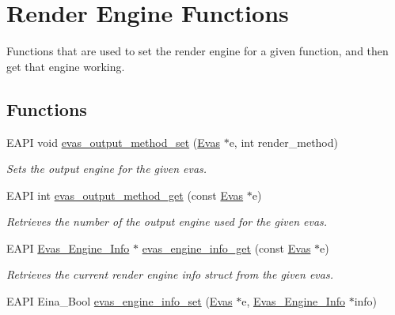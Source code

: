 \section{Render Engine Functions}
\label{group__Evas__Output__Method}


Functions that are used to set the render engine for a given function, and then get that engine working.  


\subsection*{Functions}
\begin{DoxyCompactItemize}
\item 
EAPI void \hyperlink{group__Evas__Output__Method_gab6cca6c7a5edabef057790889d560b11}{evas\_\-output\_\-method\_\-set} (\hyperlink{group__Evas__Canvas_ga5ff87cc4ce6bc43e3b640a6d37f73043}{Evas} $\ast$e, int render\_\-method)
\begin{DoxyCompactList}\small\item\em Sets the output engine for the given evas. \item\end{DoxyCompactList}\item 
EAPI int \hyperlink{group__Evas__Output__Method_gac4127a10231f1851cc3443a84fb0b059}{evas\_\-output\_\-method\_\-get} (const \hyperlink{group__Evas__Canvas_ga5ff87cc4ce6bc43e3b640a6d37f73043}{Evas} $\ast$e)
\begin{DoxyCompactList}\small\item\em Retrieves the number of the output engine used for the given evas. \item\end{DoxyCompactList}\item 
EAPI \hyperlink{struct__Evas__Engine__Info}{Evas\_\-Engine\_\-Info} $\ast$ \hyperlink{group__Evas__Output__Method_ga882d5f9411b5556719bdf28a134ee713}{evas\_\-engine\_\-info\_\-get} (const \hyperlink{group__Evas__Canvas_ga5ff87cc4ce6bc43e3b640a6d37f73043}{Evas} $\ast$e)
\begin{DoxyCompactList}\small\item\em Retrieves the current render engine info struct from the given evas. \item\end{DoxyCompactList}\item 
EAPI Eina\_\-Bool \hyperlink{group__Evas__Output__Method_gafeff04b89b4498eedf99c89e0a06e604}{evas\_\-engine\_\-info\_\-set} (\hyperlink{group__Evas__Canvas_ga5ff87cc4ce6bc43e3b640a6d37f73043}{Evas} $\ast$e, \hyperlink{struct__Evas__Engine__Info}{Evas\_\-Engine\_\-Info} $\ast$info)

\end{DoxyCompactItemize}
